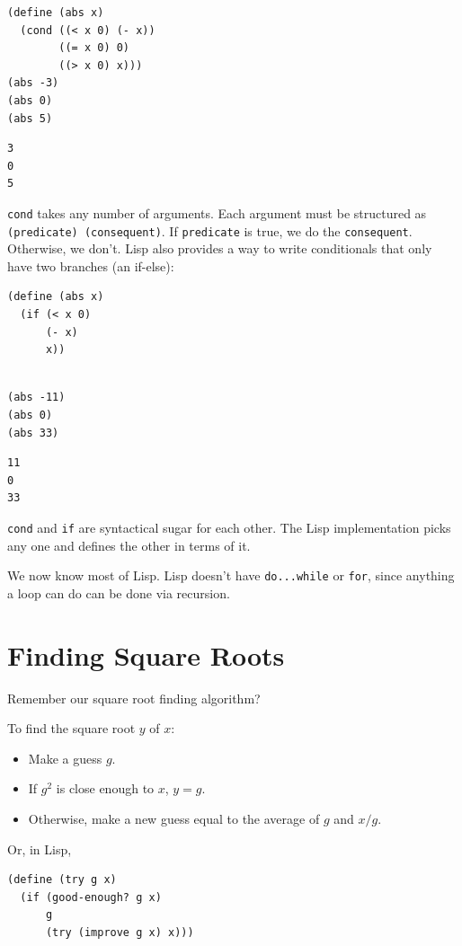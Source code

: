 \documentclass[9pt]{report}
\begin{document}
\begin{verbatim}
(define (abs x)
  (cond ((< x 0) (- x))
        ((= x 0) 0)
        ((> x 0) x)))
(abs -3)
(abs 0)
(abs 5)
\end{verbatim}

\begin{verbatim}
3
0
5
\end{verbatim}


\texttt{cond} takes any number of arguments. Each argument must be
structured as \texttt{(predicate) (consequent)}. If \texttt{predicate} is true,
we do the \texttt{consequent}. Otherwise, we don't. Lisp also provides a
way to write conditionals that only have two branches (an if-else):

\begin{verbatim}
(define (abs x)
  (if (< x 0)
      (- x)
      x))
\end{verbatim}

\begin{verbatim}

(abs -11)
(abs 0)
(abs 33)
\end{verbatim}

\begin{verbatim}
11
0
33
\end{verbatim}


\texttt{cond} and \texttt{if} are syntactical sugar for each other. The Lisp
implementation picks any one and defines the other in terms of it.

We now know most of Lisp. Lisp doesn't have \texttt{do...while} or \texttt{for},
since anything a loop can do can be done via recursion.

\section{Finding Square Roots}
\label{sec:org01d45bf}

Remember our square root finding algorithm?

To find the square root \(y\) of \(x\):
\begin{itemize}
\item Make a guess \(g\).
\item If \(g^2\) is close enough to \(x\), \(y=g\).
\item Otherwise, make a new guess equal to the average of \(g\) and
\(x/g\).
\end{itemize}

Or, in Lisp,

\begin{verbatim}
(define (try g x)
  (if (good-enough? g x)
      g
      (try (improve g x) x)))
\end{verbatim}
\end{document}
